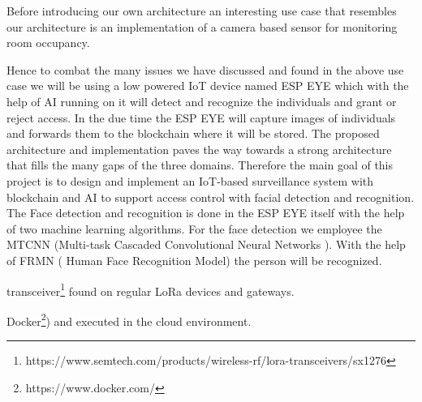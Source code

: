 Before introducing our own architecture an interesting use case that resembles  our architecture is an implementation of a camera based sensor for monitoring room occupancy. 

Hence to combat the many issues we have discussed and found in the above use case we will be using a low powered IoT device named ESP EYE which with the help of AI running on it will detect and recognize the individuals and grant or reject access. In the due time the ESP EYE will capture images of individuals and forwards them to the blockchain where it will be stored. The proposed architecture and implementation paves the way towards a strong architecture that fills the many gaps of the three domains. Therefore the main goal of this project is to design and implement an IoT-based surveillance system with blockchain and AI to support access control with facial detection and recognition. 
The Face detection and recognition is done in the ESP EYE itself with the help of two machine learning algorithms. For the face detection we employee the MTCNN (Multi-task Cascaded Convolutional Neural Networks ). With the help of FRMN ( Human Face Recognition Model) the person will be recognized. 




 transceiver\footnote{https://www.semtech.com/products/wireless-rf/lora-transceivers/sx1276} found on regular LoRa devices and gateways. 


 Docker\footnote{https://www.docker.com/}) and executed in the cloud environment. 
 
 


